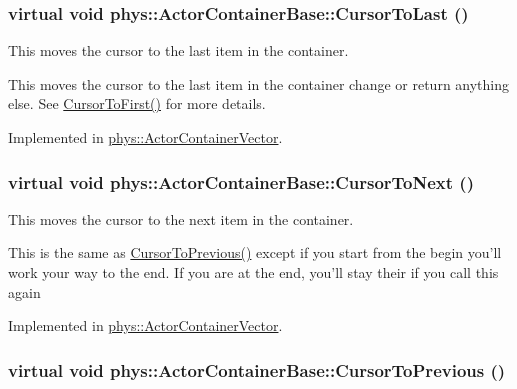 \hypertarget{classphys_1_1ActorContainerBase_afad072e018a04c190e5e5fb93b82b354}{
\subsubsection[{CursorToLast}]{\setlength{\rightskip}{0pt plus 5cm}virtual void phys::ActorContainerBase::CursorToLast ()}}
\label{d1/d00/classphys_1_1ActorContainerBase_afad072e018a04c190e5e5fb93b82b354}


This moves the cursor to the last item in the container. 

This moves the cursor to the last item in the container change or return anything else. See \hyperlink{classphys_1_1ActorContainerBase_ab1a44758d7c17e70ff2e0f8de47424c3}{CursorToFirst()} for more details. 

Implemented in \hyperlink{classphys_1_1ActorContainerVector_aa6b08266bbb57a22c07ab50514e58db4}{phys::ActorContainerVector}.

\hypertarget{classphys_1_1ActorContainerBase_a1aa337456a4e74cb5740dbae08778072}{
\subsubsection[{CursorToNext}]{\setlength{\rightskip}{0pt plus 5cm}virtual void phys::ActorContainerBase::CursorToNext ()}}
\label{d1/d00/classphys_1_1ActorContainerBase_a1aa337456a4e74cb5740dbae08778072}


This moves the cursor to the next item in the container. 

This is the same as \hyperlink{classphys_1_1ActorContainerBase_a7c424168c0bbd973b283a083714123b3}{CursorToPrevious()} except if you start from the begin you'll work your way to the end. If you are at the end, you'll stay their if you call this again 

Implemented in \hyperlink{classphys_1_1ActorContainerVector_a1c72366a6261d8e98dc0a9d2fad9f70f}{phys::ActorContainerVector}.

\hypertarget{classphys_1_1ActorContainerBase_a7c424168c0bbd973b283a083714123b3}{
\subsubsection[{CursorToPrevious}]{\setlength{\rightskip}{0pt plus 5cm}virtual void phys::ActorContainerBase::CursorToPrevious ()}}
\label{d1/d00/classphys_1_1ActorContainerBase_a7c424168c0bbd973b283a083714123b3}


